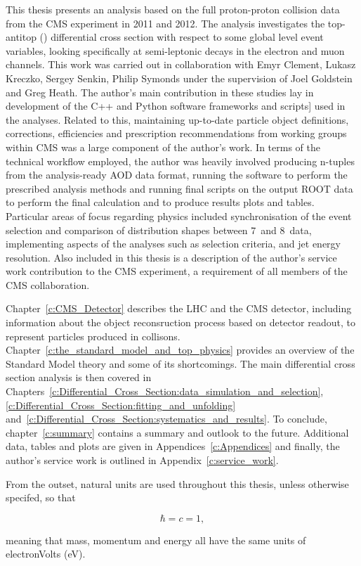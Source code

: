 This thesis presents an analysis based on the full proton-proton collision data from the CMS experiment in
2011 and 2012. The analysis investigates the top-antitop (\ttbar) differential cross section with respect to
some global level event variables, looking specifically at semi-leptonic \ttbar decays in the electron and
muon channels. This work was carried out in collaboration with Emyr Clement, L{}ukasz Kreczko, Sergey Senkin,
Philip Symonds under the supervision of Joel Goldstein and Greg Heath. The author's main contribution in these
studies lay in development of the C++ and Python software frameworks and scripts] used in the analyses.
Related to this, maintaining up-to-date particle object definitions, corrections, efficiencies and
prescription recommendations from working groups within CMS was a large component of the author's work. In
terms of the technical workflow employed, the author was heavily involved producing n-tuples from the
analysis-ready AOD data format, running the software to perform the prescribed analysis methods and running
final scripts on the output ROOT data to perform the final calculation and to produce results plots and
tables. Particular areas of focus regarding physics included synchronisation of the event selection and
comparison of distribution shapes between 7~\TeV and 8~\TeV data, implementing aspects of the analyses such as
selection criteria, \btagging and jet energy resolution. Also included in this thesis is a description of the
author's service work contribution to the CMS experiment, a requirement of all members of the CMS
collaboration.

Chapter~\ref{c:CMS_Detector} describes the LHC and the CMS detector, including information about the object
reconsruction process based on detector readout, to represent particles produced in collisons.
Chapter~\ref{c:the_standard_model_and_top_physics} provides an overview of the Standard Model theory and some
of its shortcomings. The main \ttbar differential cross section analysis is then covered in
Chapters~\ref{c:Differential_Cross_Section:data_simulation_and_selection},\ref{c:Differential_Cross_Section:fitting_and_unfolding}
and~\ref{c:Differential_Cross_Section:systematics_and_results}. To conclude, chapter~\ref{c:summary}
contains a summary and outlook to the future. Additional data, tables and plots are given in
Appendices~\ref{c:Appendices} and finally, the author's service work is outlined in Appendix~\ref{c:service_work}.

From the outset, natural units are used throughout this thesis, unless otherwise specifed, so that

\begin{equation}
\hbar = c = 1,
\end{equation}

meaning that mass, momentum and energy all have the same units of electronVolts (eV).